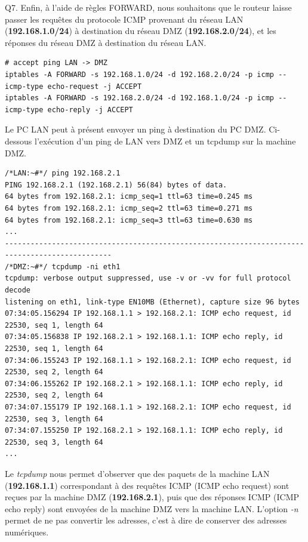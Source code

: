 \documentclass[frenchb, 11pt]{article}
\newlength{\leftbarwidth}
\newlength{\leftbarsep}
\newcommand*{\leftbarcolorcmd}{\color{leftbarcolor}} %
\renewenvironment{leftbar}{%
    \def\FrameCommand{{\leftbarcolorcmd{\vrule width \leftbarwidth\relax\hspace {\leftbarsep}}}}%
    \MakeFramed {\advance \hsize -\width \FrameRestore }%
}{%
    \endMakeFramed
}
\begin{document}
\begin{leftbar}
	\noindent Q7. Enfin, à l'aide de règles FORWARD, nous souhaitons que le routeur laisse passer les requêtes du protocole ICMP provenant du réseau LAN (\textbf{192.168.1.0/24}) à destination du réseau DMZ (\textbf{192.168.2.0/24}), et les réponses du réseau DMZ à destination du réseau LAN.
	\begin{lstlisting}[numbers=none]
# accept ping LAN -> DMZ
iptables -A FORWARD -s 192.168.1.0/24 -d 192.168.2.0/24 -p icmp --icmp-type echo-request -j ACCEPT
iptables -A FORWARD -s 192.168.2.0/24 -d 192.168.1.0/24 -p icmp --icmp-type echo-reply -j ACCEPT
	\end{lstlisting}
\end{leftbar}

Le PC LAN peut à présent envoyer un ping à destination du PC DMZ. Ci-dessous l'exécution d'un ping de LAN vers DMZ et un tcpdump sur la machine DMZ.
\begin{lstlisting}
/*LAN:~#*/ ping 192.168.2.1
PING 192.168.2.1 (192.168.2.1) 56(84) bytes of data.
64 bytes from 192.168.2.1: icmp_seq=1 ttl=63 time=0.245 ms
64 bytes from 192.168.2.1: icmp_seq=2 ttl=63 time=0.271 ms
64 bytes from 192.168.2.1: icmp_seq=3 ttl=63 time=0.630 ms
...
-----------------------------------------------------------------------------------------------
/*DMZ:~#*/ tcpdump -ni eth1
tcpdump: verbose output suppressed, use -v or -vv for full protocol decode
listening on eth1, link-type EN10MB (Ethernet), capture size 96 bytes
07:34:05.156294 IP 192.168.1.1 > 192.168.2.1: ICMP echo request, id 22530, seq 1, length 64
07:34:05.156838 IP 192.168.2.1 > 192.168.1.1: ICMP echo reply, id 22530, seq 1, length 64
07:34:06.155243 IP 192.168.1.1 > 192.168.2.1: ICMP echo request, id 22530, seq 2, length 64
07:34:06.155262 IP 192.168.2.1 > 192.168.1.1: ICMP echo reply, id 22530, seq 2, length 64
07:34:07.155179 IP 192.168.1.1 > 192.168.2.1: ICMP echo request, id 22530, seq 3, length 64
07:34:07.155250 IP 192.168.2.1 > 192.168.1.1: ICMP echo reply, id 22530, seq 3, length 64
...
\end{lstlisting}
Le \emph{tcpdump} nous permet d'observer que des paquets de la machine LAN (\textbf{192.168.1.1}) correspondant à des requêtes ICMP (ICMP echo request) sont reçues par la machine DMZ (\textbf{192.168.2.1}), puis que des réponses ICMP (ICMP echo reply) sont envoyées de la machine DMZ vers la machine LAN. L'option \emph{-n} permet de ne pas convertir les adresses, c'est à dire de conserver des adresses numériques.\\
\end{document}

